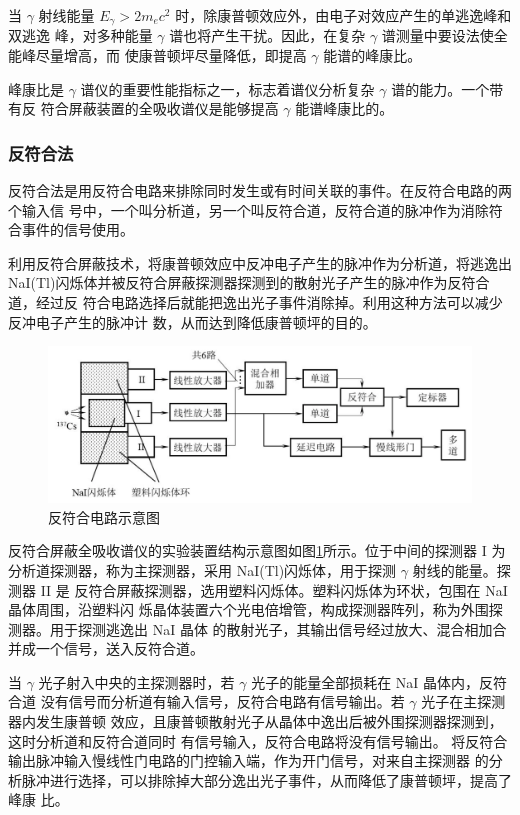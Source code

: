 \documentclass{article}
\begin{document}
当 $\gamma$ 射线能量 $E_\gamma>2m_ec^2$ 时，除康普顿效应外，由电子对效应产生的单逃逸峰和双逃逸 峰，对多种能量 $\gamma$ 谱也将产生干扰。因此，在复杂 $\gamma$ 谱测量中要设法使全能峰尽量增高，而 使康普顿坪尽量降低，即提高 $\gamma$ 能谱的峰康比。

峰康比是 $\gamma$ 谱仪的重要性能指标之一，标志着谱仪分析复杂 $\gamma$ 谱的能力。一个带有反 符合屏蔽装置的全吸收谱仪是能够提高 $\gamma$ 能谱峰康比的。
\subsubsection{反符合法}
反符合法是用反符合电路来排除同时发生或有时间关联的事件。在反符合电路的两个输入信 号中，一个叫分析道，另一个叫反符合道，反符合道的脉冲作为消除符合事件的信号使用。

利用反符合屏蔽技术，将康普顿效应中反冲电子产生的脉冲作为分析道，将逃逸出
NaI(Tl)闪烁体并被反符合屏蔽探测器探测到的散射光子产生的脉冲作为反符合道，经过反 符合电路选择后就能把逸出光子事件消除掉。利用这种方法可以减少反冲电子产生的脉冲计 数，从而达到降低康普顿坪的目的。

\begin{figure}[htbp]
    \centering
    \includegraphics[width=\textwidth]{../plots/Anti_Co_Illus.png}
    \caption{反符合电路示意图\label{fig:Anti_Co_Illus}}
\end{figure}

反符合屏蔽全吸收谱仪的实验装置结构示意图如图\ref{fig:Anti_Co_Illus}所示。位于中间的探测器 I 为分析道探测器，称为主探测器，采用 NaI(Tl)闪烁体，用于探测 $\gamma$ 射线的能量。探测器 II 是 反符合屏蔽探测器，选用塑料闪烁体。塑料闪烁体为环状，包围在 NaI 晶体周围，沿塑料闪 烁晶体装置六个光电倍增管，构成探测器阵列，称为外围探测器。用于探测逃逸出 NaI 晶体 的散射光子，其输出信号经过放大、混合相加合并成一个信号，送入反符合道。

当 $\gamma$ 光子射入中央的主探测器时，若 $\gamma$ 光子的能量全部损耗在 NaI 晶体内，反符合道
没有信号而分析道有输入信号，反符合电路有信号输出。若 $\gamma$ 光子在主探测器内发生康普顿 效应，且康普顿散射光子从晶体中逸出后被外围探测器探测到，这时分析道和反符合道同时 有信号输入，反符合电路将没有信号输出。
将反符合输出脉冲输入慢线性门电路的门控输入端，作为开门信号，对来自主探测器 的分析脉冲进行选择，可以排除掉大部分逸出光子事件，从而降低了康普顿坪，提高了峰康 比。
\end{document}
